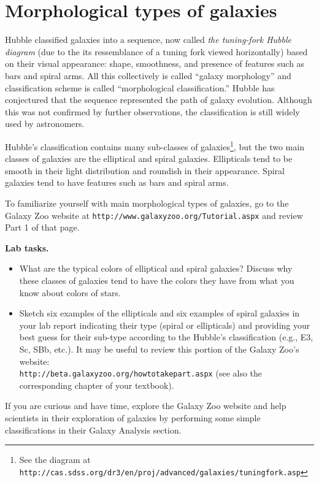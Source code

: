 \documentclass[12pt]{article}
\begin{document}
\section*{Morphological types of galaxies}

Hubble classified galaxies into a sequence, now called {\it the tuning-fork Hubble diagram} (due
to the its ressemblance of a tuning fork viewed horizontally) based on their
visual appearance: shape, smoothness, and presence of features such as bars and spiral arms. All this
collectively is called ``galaxy morphology'' and classification scheme is called ``morphological 
classification.'' Hubble has conjectured
that the sequence represented the path of galaxy evolution. Although this was not confirmed
by further observations, the classification is still widely used by astronomers. 

Hubble's classification contains many sub-classes of galaxies\footnote{See the diagram at\\{\tt http://cas.sdss.org/dr3/en/proj/advanced/galaxies/tuningfork.asp}}, but the two main 
classes of galaxies are the elliptical and spiral galaxies. Ellipticals tend to be
smooth in their light distribution and roundish in their appearance. 
Spiral galaxies tend to have features such as bars and spiral arms. 

To familiarize yourself with main morphological types of galaxies, go to the Galaxy Zoo website
at \texttt{http://www.galaxyzoo.org/Tutorial.aspx} and review Part 1 of that page.

{\bf Lab tasks.} 
{\it
\begin{itemize}
\item What are the typical colors of elliptical and spiral galaxies? Discuss why these classes
of galaxies tend to have the colors they have from what you know about colors of stars. 
\item Sketch six examples of the ellipticals and six examples of spiral galaxies in your lab report indicating their
type (spiral or ellipticals) and providing your best guess for their sub-type according to the
Hubble's classification (e.g., E3, Sc, SBb, etc.). It may be useful to review this portion
of the Galaxy Zoo's website:\\ {\tt http://beta.galaxyzoo.org/howtotakepart.aspx} (see also
the corresponding chapter of your textbook). 
\end{itemize}
}

If you are curious and have time, explore the Galaxy Zoo website and help scientists 
in their exploration of galaxies by performing some simple classifications in their Galaxy Analysis 
section. 
\end{document}
